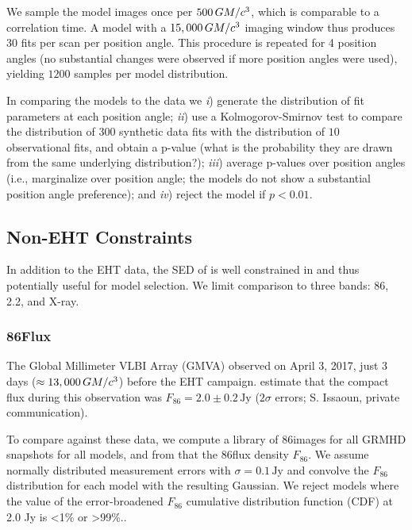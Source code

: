 We sample the model images once per $500\,GM/c^3$, which is comparable to a correlation time.  A model with a $15,000\,GM/c^3$ imaging window thus produces $30$ fits per scan per position angle.  This procedure is repeated for 4 position angles (no substantial changes were observed if more position angles were used), yielding $1200$ samples per model distribution.

In comparing the models to the data we
\emph{i}) generate the distribution of fit parameters at each position angle;
\emph{ii}) use a Kolmogorov-Smirnov test to compare the distribution of $300$ synthetic data fits with the distribution of $10$ observational fits, and obtain a p-value (what is the probability they are drawn from the same underlying distribution?);
\emph{iii}) average p-values over position angles (i.e., marginalize over position angle; the models do not show a substantial position angle preference); and
\emph{iv}) reject the model if $p < 0.01$.

\subsection{Non-EHT Constraints}

In addition to the EHT data, the SED of \sgra is well constrained in  and thus potentially useful for model selection.
We limit comparison to three bands: 86\GHz, 2.2\um, and X-ray.

\subsubsection{86\GHz Flux}

The Global Millimeter VLBI Array (GMVA) observed \sgra on April 3, 2017, just 3 days ($\approx 13,000 \,GM/c^3$) before the EHT campaign.
\citet{2019ApJ...871...30I} estimate that the compact flux during this observation was $F_{86} = 2.0 \pm 0.2\,\mathrm{Jy}$ ($2\sigma$ errors; S. Issaoun, private communication).

To compare against these data, we compute a library of 86\GHz images for all GRMHD snapshots for all models, and from that the 86\GHz flux density $F_{86}$.  We assume normally distributed measurement errors with $\sigma = 0.1\,\mathrm{Jy}$ and convolve the $F_{86}$ distribution for each model with the resulting Gaussian.  We reject models where the value of the error-broadened $F_{86}$ cumulative distribution function (CDF) at 2.0 Jy is <1\% or >99\%..

